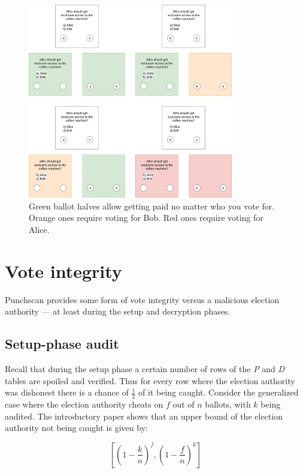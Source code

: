 \begin{figure}
\centering
\includegraphics[width=0.8\textwidth]{../resources/vote_buying_split_highlighted_no_selection.drawio.png}
\caption{Green ballot halves allow getting paid no matter who you vote for. Orange ones require voting for Bob. Red ones require voting for Alice.}
\label{fig:vote_buying}
\end{figure}

\section{Vote integrity}

Punchscan provides some form of vote integrity versus a malicious election
authority --- at least during the setup and decryption phases.

\subsection{Setup-phase audit}

Recall that during the setup phase a certain number of rows of the \emph{P} and
\emph{D} tables are spoiled and verified. Thus for every row where the election authority 
was dishonest there is a chance of $\frac{1}{2}$ of it being caught. Consider the
generalized case where the election authority cheats on $f$ out of $n$ ballots,
with $k$ being audited. The introductory paper shows that an upper bound of the
election authority not being caught is given by:

\[
	[(1 - \frac{k}{n})^f, (1 - \frac{f}{n})^k]
\]

